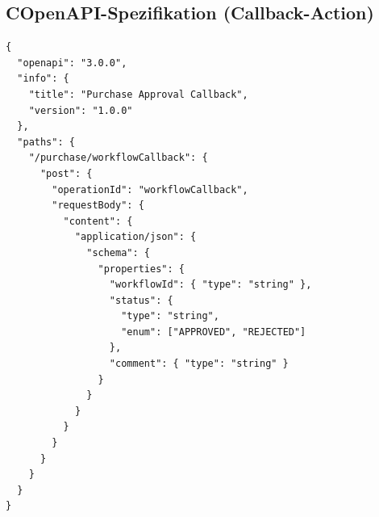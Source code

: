 \subsection*{C\quad OpenAPI-Spezifikation (Callback-Action)}
\begin{lstlisting}[caption={OpenAPI-Spezifikation für den Workflow-Callback},label={lst:anhang-openapi}]
{
  "openapi": "3.0.0",
  "info": {
    "title": "Purchase Approval Callback",
    "version": "1.0.0"
  },
  "paths": {
    "/purchase/workflowCallback": {
      "post": {
        "operationId": "workflowCallback",
        "requestBody": {
          "content": {
            "application/json": {
              "schema": {
                "properties": {
                  "workflowId": { "type": "string" },
                  "status": {
                    "type": "string",
                    "enum": ["APPROVED", "REJECTED"]
                  },
                  "comment": { "type": "string" }
                }
              }
            }
          }
        }
      }
    }
  }
}
\end{lstlisting}

